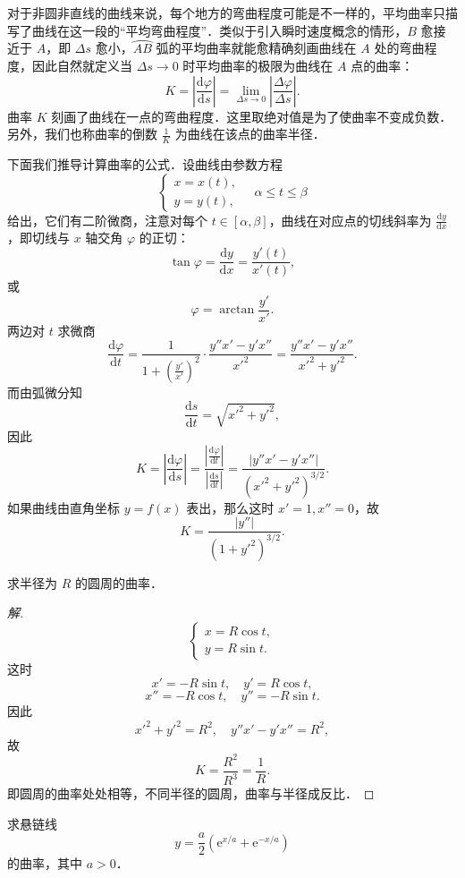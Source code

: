 对于非圆非直线的曲线来说，每个地方的弯曲程度可能是不一样的，平均曲率只描写了曲线在这一段的“平均弯曲程度”．类似于引入瞬时速度概念的情形，$B$ 愈接近于 $A$，即 $\Delta s$ 愈小，$\wideparen{AB}$ 弧的平均曲率就能愈精确刻画曲线在 $A$ 处的弯曲程度，因此自然就定义当 $\Delta s \to 0$ 时平均曲率的极限为曲线在 $A$ 点的曲率：
\[
K = \left|\frac{\mathrm{d}\varphi}{\mathrm{d}s}\right| = \lim_{\Delta s\to 0}\left|\frac{\Delta\varphi}{\Delta s}\right|.
\]
曲率 $K$ 刻画了曲线在一点的弯曲程度．这里取绝对值是为了使曲率不变成负数．另外，我们也称曲率的倒数 $\frac{1}{K}$ 为曲线在该点的曲率半径．

下面我们推导计算曲率的公式．设曲线由参数方程
\[
\begin{cases}
x = x(t), \\
y = y(t),
\end{cases}
\quad \alpha \leqslant t \leqslant \beta
\]
给出，它们有二阶微商，注意对每个 $t \in [\alpha, \beta]$，曲线在对应点的切线斜率为 $\frac{\mathrm{d}y}{\mathrm{d}x}$，即切线与 $x$ 轴交角 $\varphi$ 的正切：
\[
\tan\varphi = \frac{\mathrm{d}y}{\mathrm{d}x} = \frac{y'(t)}{x'(t)},
\]
或
\[
\varphi = \arctan\frac{y'}{x'}.
\]
两边对 $t$ 求微商
\[
\frac{\mathrm{d}\varphi}{\mathrm{d}t} = \frac{1}{1 + \left(\frac{y'}{x'}\right)^2}\cdot\frac{y''x' - y'x''}{x'^2} = \frac{y''x' - y'x''}{x'^2 + y'^2}.
\]
而由弧微分知
\[
\frac{\mathrm{d}s}{\mathrm{d}t} = \sqrt{x'^2 + y'^2},
\]
因此
\[
K = \left|\frac{\mathrm{d}\varphi}{\mathrm{d}s}\right| = \frac{\left|\frac{\mathrm{d}\varphi}{\mathrm{d}t}\right|}{\left|\frac{\mathrm{d}s}{\mathrm{d}t}\right|} = \frac{|y''x' - y'x''|}{(x'^2 + y'^2)^{3/2}}.
\]
如果曲线由直角坐标 $y = f(x)$ 表出，那么这时 $x' = 1, x'' = 0$，故
\[
K = \frac{|y''|}{(1 + y'^2)^{3/2}}.
\]

\begin{example}
求半径为 $R$ 的圆周的曲率．
\end{example}

\begin{proof}[解]
\[
\begin{cases}
x = R\cos t, \\
y = R\sin t.
\end{cases}
\]
这时
\[
x' = -R\sin t, \quad y' = R\cos t,
\]
\[
x'' = -R\cos t, \quad y'' = -R\sin t.
\]
因此
\[
x'^2 + y'^2 = R^2, \quad y''x' - y'x'' = R^2,
\]
故
\[
K = \frac{R^2}{R^3} = \frac{1}{R}.
\]
即圆周的曲率处处相等，不同半径的圆周，曲率与半径成反比．
\end{proof}

\begin{example}
求悬链线
\[
y = \frac{a}{2}\left(\mathrm{e}^{x/a} + \mathrm{e}^{-x/a}\right)
\]
的曲率，其中 $a > 0$．
\end{example}


